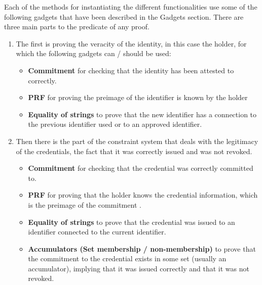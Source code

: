 Each of the methods for instantiating the different functionalities use some of the following gadgets that have been described in the Gadgets section. There are three main parts to the predicate of any proof.
\begin{enumerate}
\item The first is proving the veracity of the identity, in this case the holder, for which the following gadgets can / should be used:
		\begin{itemize}
		\item \textbf{Commitment} for checking that the identity has been attested 			to correctly.
		\item \textbf{PRF} for proving the preimage of the identifier is known by the holder
		\item \textbf{Equality of strings} to prove that the new identifier has a connection to the previous identifier used or to an approved identifier.\
		\end{itemize}

\item Then there is the part of the constraint system that deals with the legitimacy of the credentials, the fact that it was correctly issued and was not revoked. 	
		\begin{itemize}
		\item \textbf{Commitment} for checking that the credential was correctly committed to.	
		\item \textbf{PRF} for proving that the holder knows the credential information, which is the preimage of the commitment .
		\item \textbf{Equality of strings} to prove that the credential was issued to an identifier connected to the current identifier.
		\item \textbf{Accumulators (Set membership / non-membership)} to prove that the commitment to the credential exists in some set (usually an accumulator), implying that it was issued correctly and that it was not revoked.
		\end{itemize}


\end{enumerate}

